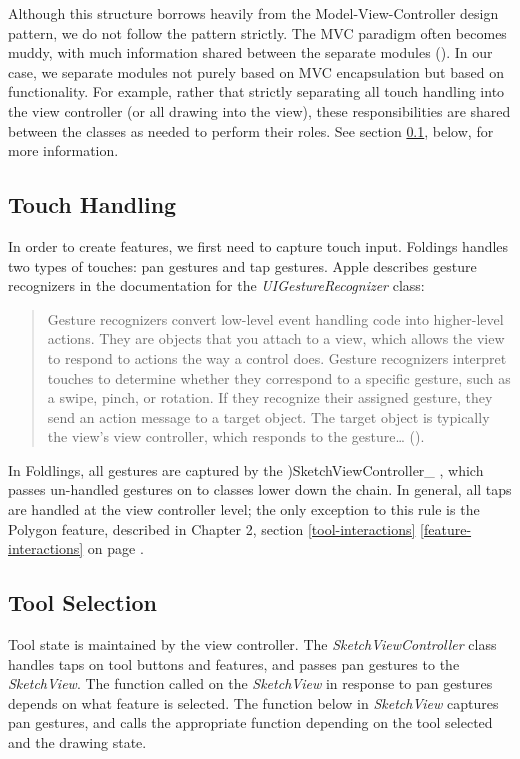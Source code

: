 Although this structure borrows heavily from the Model-View-Controller
design pattern, we do not follow the pattern strictly. The MVC paradigm
often becomes muddy, with much information shared between the separate
modules (\citet{veit2003model}). In our case, we separate modules not
purely based on MVC encapsulation but based on functionality. For
example, rather that strictly separating all touch handling into the
view controller (or all drawing into the view), these responsibilities
are shared between the classes as needed to perform their roles. See
section \ref{touch-handling}, below, for more information.

\subsection{Touch Handling}\label{touch-handling}

In order to create features, we first need to capture touch input.
Foldings handles two types of touches: pan gestures and tap gestures.
Apple describes gesture recognizers in the documentation for the
\emph{UIGestureRecognizer} class:

\begin{quote}
Gesture recognizers convert low-level event handling code into
higher-level actions. They are objects that you attach to a view, which
allows the view to respond to actions the way a control does. Gesture
recognizers interpret touches to determine whether they correspond to a
specific gesture, such as a swipe, pinch, or rotation. If they recognize
their assigned gesture, they send an action message to a target object.
The target object is typically the view's view controller, which
responds to the gesture\ldots{} (\citet{appledocs}).
\end{quote}

In Foldlings, all gestures are captured by the )SketchViewController\_ ,
which passes un-handled gestures on to classes lower down the chain. In
general, all taps are handled at the view controller level; the only
exception to this rule is the Polygon feature, described in Chapter 2,
section \ref{tool-interactions} \ref{feature-interactions}
 on page \pageref{feature-interactions}.

\subsection{Tool Selection}\label{tool-selection}

Tool state is maintained by the view controller. The
\emph{SketchViewController} class handles taps on tool buttons and
features, and passes pan gestures to the \emph{SketchView}. The function
called on the \emph{SketchView} in response to pan gestures depends on
what feature is selected. The function below in \emph{SketchView}
captures pan gestures, and calls the appropriate function depending on
the tool selected and the drawing state.

